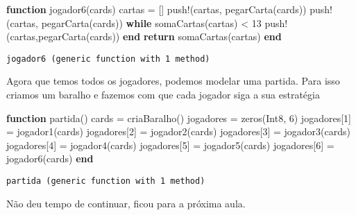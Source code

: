 \documentclass[
  letterpaper,
  DIV=11,
  numbers=noendperiod]{scrreprt}
\newenvironment{Shaded}{\begin{snugshade}}{\end{snugshade}}
\newcommand{\ControlFlowTok}[1]{\textcolor[rgb]{0.00,0.23,0.31}{\textbf{#1}}}
\newcommand{\DataTypeTok}[1]{\textcolor[rgb]{0.68,0.00,0.00}{#1}}
\newcommand{\FloatTok}[1]{\textcolor[rgb]{0.68,0.00,0.00}{#1}}
\newcommand{\FunctionTok}[1]{\textcolor[rgb]{0.28,0.35,0.67}{#1}}
\newcommand{\KeywordTok}[1]{\textcolor[rgb]{0.00,0.23,0.31}{\textbf{#1}}}
\newcommand{\NormalTok}[1]{\textcolor[rgb]{0.00,0.23,0.31}{#1}}
\newcommand{\OperatorTok}[1]{\textcolor[rgb]{0.37,0.37,0.37}{#1}}
\begin{document}
\begin{Shaded}
\begin{Highlighting}[]
\KeywordTok{function} \FunctionTok{jogador6}\NormalTok{(cards)}
\NormalTok{  cartas }\OperatorTok{=}\NormalTok{ []}
  \FunctionTok{push!}\NormalTok{(cartas, }\FunctionTok{pegarCarta}\NormalTok{(cards))}
  \FunctionTok{push!}\NormalTok{(cartas, }\FunctionTok{pegarCarta}\NormalTok{(cards))}
  \ControlFlowTok{while} \FunctionTok{somaCartas}\NormalTok{(cartas) }\OperatorTok{\textless{}} \FloatTok{13}
    \FunctionTok{push!}\NormalTok{(cartas,}\FunctionTok{pegarCarta}\NormalTok{(cards))}
  \ControlFlowTok{end}
  \ControlFlowTok{return} \FunctionTok{somaCartas}\NormalTok{(cartas)}
\KeywordTok{end}
\end{Highlighting}
\end{Shaded}

\begin{verbatim}
jogador6 (generic function with 1 method)
\end{verbatim}

Agora que temos todos os jogadores, podemos modelar uma partida. Para
isso criamos um baralho e fazemos com que cada jogador siga a sua
estratégia

\begin{Shaded}
\begin{Highlighting}[]
\KeywordTok{function} \FunctionTok{partida}\NormalTok{()}
\NormalTok{  cards }\OperatorTok{=} \FunctionTok{criaBaralho}\NormalTok{()}
\NormalTok{  jogadores }\OperatorTok{=} \FunctionTok{zeros}\NormalTok{(}\DataTypeTok{Int8}\NormalTok{, }\FloatTok{6}\NormalTok{)}
\NormalTok{  jogadores[}\FloatTok{1}\NormalTok{] }\OperatorTok{=} \FunctionTok{jogador1}\NormalTok{(cards)}
\NormalTok{  jogadores[}\FloatTok{2}\NormalTok{] }\OperatorTok{=} \FunctionTok{jogador2}\NormalTok{(cards)}
\NormalTok{  jogadores[}\FloatTok{3}\NormalTok{] }\OperatorTok{=} \FunctionTok{jogador3}\NormalTok{(cards)}
\NormalTok{  jogadores[}\FloatTok{4}\NormalTok{] }\OperatorTok{=} \FunctionTok{jogador4}\NormalTok{(cards)}
\NormalTok{  jogadores[}\FloatTok{5}\NormalTok{] }\OperatorTok{=} \FunctionTok{jogador5}\NormalTok{(cards)}
\NormalTok{  jogadores[}\FloatTok{6}\NormalTok{] }\OperatorTok{=} \FunctionTok{jogador6}\NormalTok{(cards)}
\KeywordTok{end}
\end{Highlighting}
\end{Shaded}

\begin{verbatim}
partida (generic function with 1 method)
\end{verbatim}

Não deu tempo de continuar, ficou para a próxima aula.
\end{document}
